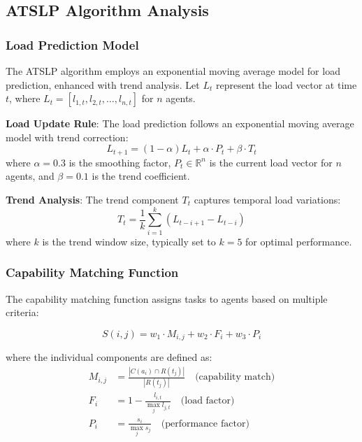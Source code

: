 \documentclass[conference]{IEEEtran}
\begin{document}
\subsection{ATSLP Algorithm Analysis}

\subsubsection{Load Prediction Model}

The ATSLP algorithm employs an exponential moving average model for load prediction, enhanced with trend analysis. Let $L_t$ represent the load vector at time $t$, where $L_t = [l_{1,t}, l_{2,t}, \ldots, l_{n,t}]$ for $n$ agents.

\textbf{Load Update Rule}: The load prediction follows an exponential moving average model with trend correction:
\begin{equation}
L_{t+1} = (1-\alpha)L_t + \alpha \cdot P_t + \beta \cdot T_t
\end{equation}
where $\alpha = 0.3$ is the smoothing factor, $P_t \in \mathbb{R}^n$ is the current load vector for $n$ agents, and $\beta = 0.1$ is the trend coefficient.

\textbf{Trend Analysis}: The trend component $T_t$ captures temporal load variations:
\begin{equation}
T_t = \frac{1}{k}\sum_{i=1}^{k} (L_{t-i+1} - L_{t-i})
\end{equation}
where $k$ is the trend window size, typically set to $k = 5$ for optimal performance.

\subsubsection{Capability Matching Function}

The capability matching function assigns tasks to agents based on multiple criteria:

\begin{equation}
S(i,j) = w_1 \cdot M_{i,j} + w_2 \cdot F_i + w_3 \cdot P_i
\end{equation}

where the individual components are defined as:
\begin{align}
M_{i,j} &= \frac{|C(a_i) \cap R(t_j)|}{|R(t_j)|} \quad \text{(capability match)} \\
F_i &= 1 - \frac{l_{i,t}}{\max_{j} l_{j,t}} \quad \text{(load factor)} \\
P_i &= \frac{s_i}{\max_{j} s_j} \quad \text{(performance factor)}
\end{align}
\end{document}
